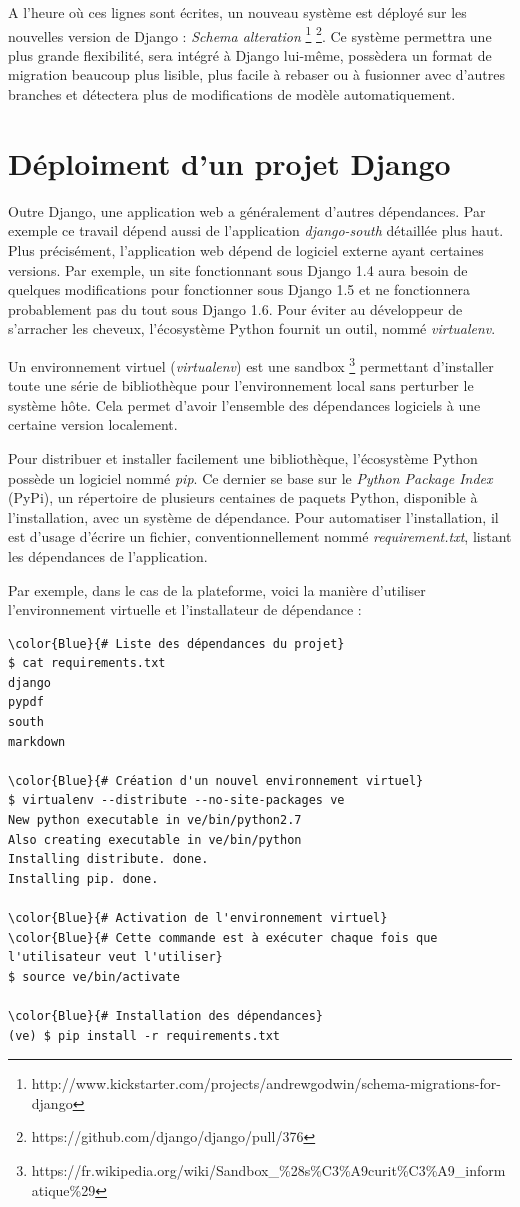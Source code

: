 \documentclass[a4paper,12pt]{article}
\begin{document}
A l'heure où ces lignes sont écrites, un nouveau système est déployé sur
les nouvelles version de Django : \textit{Schema alteration}
\footnote{http://www.kickstarter.com/projects/andrewgodwin/schema-migrations-for-django}
\footnote{https://github.com/django/django/pull/376}. Ce système permettra
une plus grande flexibilité, sera intégré à Django lui-même, possèdera un
format de migration beaucoup plus lisible, plus facile à rebaser ou à
fusionner avec d'autres branches et détectera plus de modifications de modèle
automatiquement.


\section{Déploiment d'un projet Django}

Outre Django, une application web a généralement d'autres dépendances. Par exemple
ce travail dépend aussi de l'application \textit{django-south} détaillée plus haut.
Plus précisément, l'application web dépend de logiciel externe ayant certaines versions.
Par exemple, un site fonctionnant sous Django 1.4 aura besoin de quelques modifications
pour fonctionner sous Django 1.5 et ne fonctionnera probablement pas du tout sous
Django 1.6. Pour éviter au développeur de s'arracher les cheveux, l'écosystème Python
fournit un outil, nommé \textit{virtualenv}.

Un environnement virtuel (\textit{virtualenv}) est une sandbox
\footnote{https://fr.wikipedia.org/wiki/Sandbox\_\%28s\%C3\%A9curit\%C3\%A9\_informatique\%29}
permettant d'installer toute une série de bibliothèque pour l'environnement
local sans perturber le système hôte. Cela permet d'avoir l'ensemble des dépendances
logiciels à une certaine version localement.

Pour distribuer et installer facilement une bibliothèque, l'écosystème Python
possède un logiciel nommé \textit{pip}. Ce dernier se base sur le
\textit{Python Package Index} (PyPi), un répertoire de plusieurs centaines de
paquets Python, disponible à l'installation, avec un système de dépendance.
Pour automatiser l'installation, il est d'usage d'écrire un fichier, conventionnellement
nommé \textit{requirement.txt}, listant les dépendances de l'application.

Par exemple, dans le cas de la plateforme, voici la manière d'utiliser l'environnement
virtuelle et l'installateur de dépendance :

\begin{Verbatim}
\color{Blue}{# Liste des dépendances du projet}
$ cat requirements.txt
django
pypdf
south
markdown

\color{Blue}{# Création d'un nouvel environnement virtuel}
$ virtualenv --distribute --no-site-packages ve
New python executable in ve/bin/python2.7
Also creating executable in ve/bin/python
Installing distribute. done.
Installing pip. done.

\color{Blue}{# Activation de l'environnement virtuel}
\color{Blue}{# Cette commande est à exécuter chaque fois que l'utilisateur veut l'utiliser}
$ source ve/bin/activate

\color{Blue}{# Installation des dépendances}
(ve) $ pip install -r requirements.txt
\end{Verbatim}
\end{document}
